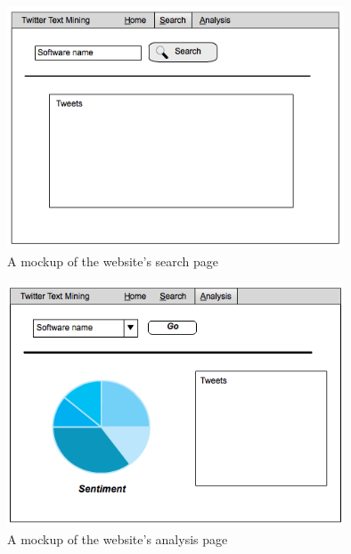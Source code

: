 \begin{figure}[h]
\begin{center}
\includegraphics[width=10cm]{guiwire2}
\end{center}
\caption{A mockup of the website's search page}
\label{fig:guiwire2}
\end{figure}

\begin{figure}[h]
\begin{center}
\includegraphics[width=10cm]{guiwire3}
\end{center}
\caption{A mockup of the website's analysis page}
\label{fig:guiwire3}
\end{figure}

